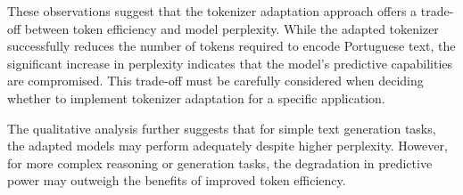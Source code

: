 These observations suggest that the tokenizer adaptation approach offers a trade-off between token efficiency and model perplexity. While the adapted tokenizer successfully reduces the number of tokens required to encode Portuguese text, the significant increase in perplexity indicates that the model's predictive capabilities are compromised. This trade-off must be carefully considered when deciding whether to implement tokenizer adaptation for a specific application.

The qualitative analysis further suggests that for simple text generation tasks, the adapted models may perform adequately despite higher perplexity. However, for more complex reasoning or generation tasks, the degradation in predictive power may outweigh the benefits of improved token efficiency.